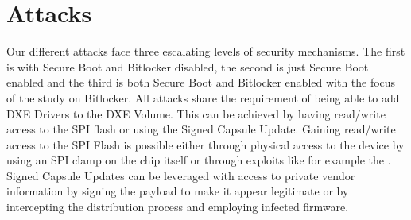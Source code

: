 
\chapter{Attacks}

Our different attacks face three escalating levels of security mechanisms. The first is with Secure Boot and Bitlocker disabled, the second is just Secure Boot enabled and the third is both Secure Boot and Bitlocker enabled with the focus of the study on Bitlocker.
All attacks share the requirement of being able to add DXE Drivers to the DXE Volume.
This can be achieved by having read/write access to the SPI flash or using the Signed Capsule Update. Gaining read/write access to the SPI Flash is possible either through physical access to the device by using an SPI clamp on the chip itself or through exploits like for example the
. Signed Capsule Updates can be leveraged with access to private vendor information by signing the payload to make it appear legitimate or by intercepting the distribution process and employing infected firmware.



